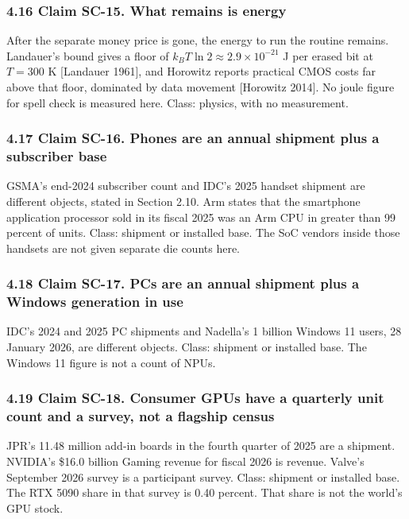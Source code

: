 \documentclass[
  10pt,
]{article}
\begin{document}
\subsubsection{4.16 Claim SC-15. What remains is
energy}\label{claim-sc-15.-what-remains-is-energy}

After the separate money price is gone, the energy to run the routine
remains. Landauer's bound gives a floor of
\(k_B T \ln 2 \approx 2.9 \times 10^{-21}\) J per erased bit at
\(T = 300\) K {[}Landauer 1961{]}, and Horowitz reports practical CMOS
costs far above that floor, dominated by data movement {[}Horowitz
2014{]}. No joule figure for spell check is measured here. Class:
physics, with no measurement.

\subsubsection{4.17 Claim SC-16. Phones are an annual shipment plus a
subscriber
base}\label{claim-sc-16.-phones-are-an-annual-shipment-plus-a-subscriber-base}

GSMA's end-2024 subscriber count and IDC's 2025 handset shipment are
different objects, stated in Section 2.10. Arm states that the
smartphone application processor sold in its fiscal 2025 was an Arm CPU
in greater than 99 percent of units. Class: shipment or installed base.
The SoC vendors inside those handsets are not given separate die counts
here.

\subsubsection{4.18 Claim SC-17. PCs are an annual shipment plus a
Windows generation in
use}\label{claim-sc-17.-pcs-are-an-annual-shipment-plus-a-windows-generation-in-use}

IDC's 2024 and 2025 PC shipments and Nadella's 1 billion Windows 11
users, 28 January 2026, are different objects. Class: shipment or
installed base. The Windows 11 figure is not a count of NPUs.

\subsubsection{4.19 Claim SC-18. Consumer GPUs have a quarterly unit
count and a survey, not a flagship
census}\label{claim-sc-18.-consumer-gpus-have-a-quarterly-unit-count-and-a-survey-not-a-flagship-census}

JPR's 11.48 million add-in boards in the fourth quarter of 2025 are a
shipment. NVIDIA's \$16.0 billion Gaming revenue for fiscal 2026 is
revenue. Valve's September 2026 survey is a participant survey. Class:
shipment or installed base. The RTX 5090 share in that survey is 0.40
percent. That share is not the world's GPU stock.
\end{document}
